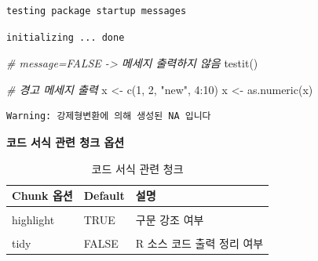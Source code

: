 \documentclass[
  11pt,
]{krantz}
\newenvironment{Shaded}{\begin{snugshade}}{\end{snugshade}}
\newcommand{\CommentTok}[1]{\textcolor[rgb]{0.37,0.37,0.37}{\textit{#1}}}
\newcommand{\DecValTok}[1]{\textcolor[rgb]{0.06,0.06,0.06}{#1}}
\newcommand{\FunctionTok}[1]{\textcolor[rgb]{0,0,0}{#1}}
\newcommand{\NormalTok}[1]{#1}
\newcommand{\OtherTok}[1]{\textcolor[rgb]{0.37,0.37,0.37}{#1}}
\newcommand{\SpecialCharTok}[1]{\textcolor[rgb]{0,0,0}{#1}}
\newcommand{\StringTok}[1]{\textcolor[rgb]{0.5,0.5,0.5}{#1}}
\begin{document}
\begin{verbatim}
testing package startup messages
\end{verbatim}

\begin{verbatim}
initializing ... done
\end{verbatim}

\normalsize

\footnotesize

\begin{Shaded}
\begin{Highlighting}[]
\CommentTok{\# message=FALSE {-}\textgreater{} 메세지 출력하지 않음}
\FunctionTok{testit}\NormalTok{()}
\end{Highlighting}
\end{Shaded}

\normalsize

\footnotesize

\begin{Shaded}
\begin{Highlighting}[]
\CommentTok{\# 경고 메세지 출력}
\NormalTok{x }\OtherTok{\textless{}{-}} \FunctionTok{c}\NormalTok{(}\DecValTok{1}\NormalTok{, }\DecValTok{2}\NormalTok{, }\StringTok{"new"}\NormalTok{, }\DecValTok{4}\SpecialCharTok{:}\DecValTok{10}\NormalTok{)}
\NormalTok{x }\OtherTok{\textless{}{-}} \FunctionTok{as.numeric}\NormalTok{(x)}
\end{Highlighting}
\end{Shaded}

\begin{verbatim}
Warning: 강제형변환에 의해 생성된 NA 입니다
\end{verbatim}

\normalsize

\textbf{코드 서식 관련 청크 옵션}

\footnotesize

\begin{table}[H]

\caption{\label{tab:chunk-tab-03}코드 서식 관련 청크}
\centering
\fontsize{14}{16}\selectfont
\begin{tabular}[t]{>{\raggedright\arraybackslash}p{3cm}>{\raggedright\arraybackslash}p{3cm}>{\raggedright\arraybackslash}p{8cm}}
\toprule
Chunk 옵션 & Default & 설명\\
\midrule
\cellcolor{gray!6}{comment} & \cellcolor{gray!6}{TRUE} & \cellcolor{gray!6}{소스 코드 실행 출력의 각 줄 앞에 붙는 표시문자 출력 여부: 기본 값은 '\#\#' 임}\\
highlight & TRUE & 구문 강조 여부\\
\cellcolor{gray!6}{prompt} & \cellcolor{gray!6}{FALSE} & \cellcolor{gray!6}{R 프롬프트 출력 여부}\\
tidy & FALSE & R 소스 코드 출력 정리 여부\\
\bottomrule
\end{tabular}
\end{table}
\end{document}
